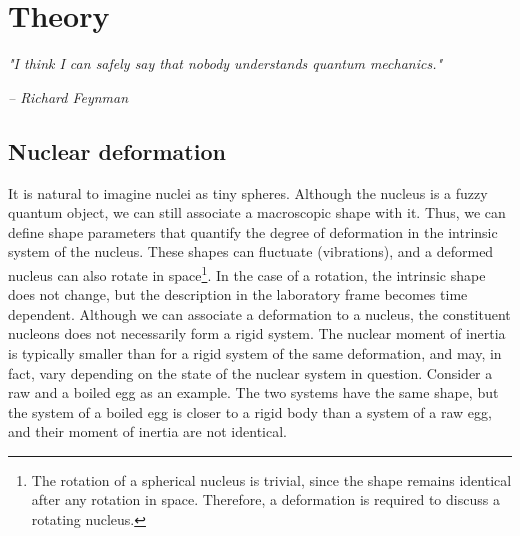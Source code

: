 \documentclass[twoside,english]{uiofysmaster/uiofysmaster}
\let\orgautoref\autoref
\renewcommand{\autoref}
        {%
		 \def\sectionautorefname{Section}%
		 \def\subsectionautorefname{Section}%
		 \def\subsubsectionautorefname{Section}%
		 \def\chapterautorefname{Chapter}%
          \orgautoref}
\begin{document}


\chapter{Theory}\label{ch:theory}
\epigraph{\textit{"I think I can safely say that nobody understands quantum mechanics."}}{\textit{– Richard Feynman}}


\section{Nuclear deformation}\label{sec:deformation}
It is natural to imagine nuclei as tiny spheres.
Although the nucleus is a fuzzy quantum object, we can still associate a macroscopic shape with it.
Thus, we can define shape parameters that quantify the degree of deformation in the intrinsic system of the nucleus. 
These shapes can fluctuate (vibrations), and a deformed nucleus can also rotate in space\footnote{The rotation of a spherical nucleus is trivial, since the shape remains identical after any rotation in space. Therefore, a deformation is required to discuss a rotating nucleus.}.
In the case of a rotation, the intrinsic shape does not change, but the description in the laboratory frame becomes time dependent. 
Although we can associate a deformation to a nucleus, the constituent nucleons does not necessarily form a rigid system. 
The nuclear moment of inertia is typically smaller than for a rigid system of the same deformation, and may, in fact, vary depending on the state of the nuclear system in question.  
Consider a raw and a boiled egg as an example. 
The two systems have the same shape, but the system of a boiled egg is closer to a rigid body than a system of a raw egg, and their moment of inertia are not identical.
\end{document}
